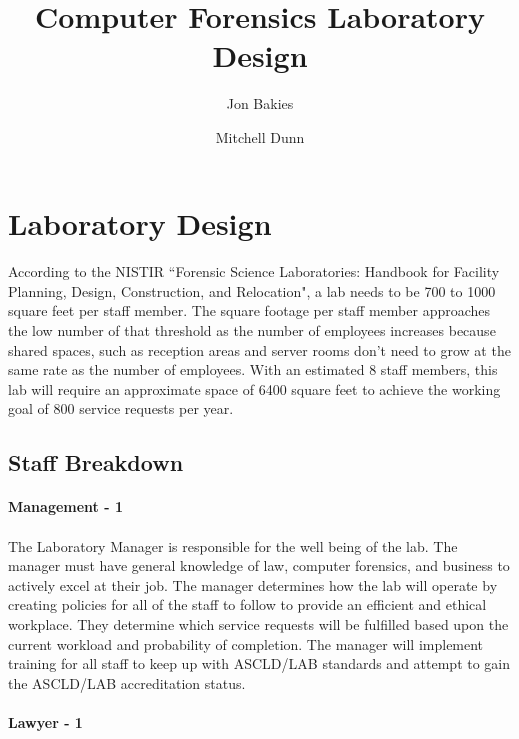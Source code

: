 \documentclass{article}
\begin{document}
\title{Computer Forensics Laboratory Design}
\author{Jon Bakies \and Mitchell Dunn} 

\maketitle
\newpage

\tableofcontents
\newpage


\section{Laboratory Design}
\paragraph{} According to the NISTIR ``Forensic Science Laboratories: Handbook for Facility Planning, Design, Construction, and Relocation", a lab needs to be 700 to 1000 square feet per staff member.
The square footage per staff member approaches the low number of that threshold as the number of employees increases because shared spaces, such as reception areas and server rooms don't need to grow at the same rate as the number of employees.
With an estimated 8 staff members, this lab will require an approximate space of 6400 square feet to achieve the working goal of 800 service requests per year.

\subsection{Staff Breakdown}
\paragraph {Management - 1} 
\paragraph{} The Laboratory Manager is responsible for the well being of the lab.
The manager must have general knowledge of law, computer forensics, and business to actively excel at their job.
The manager determines how the lab will operate by creating policies for all of the staff to follow to provide an efficient and ethical workplace.
They determine which service requests will be fulfilled based upon the current workload and probability of completion.
The manager will implement training for all staff to keep up with ASCLD/LAB standards and attempt to gain the ASCLD/LAB accreditation status.
  

\paragraph{Lawyer - 1} 
\end{document}
